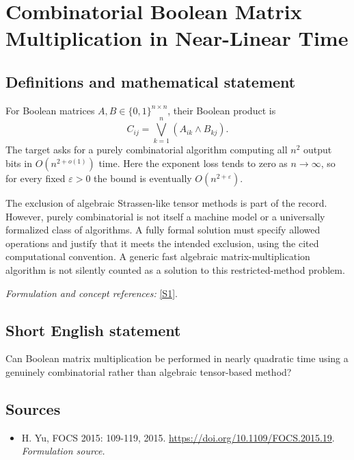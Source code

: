 \documentclass[11pt]{article}
\begin{document}
\section*{\texorpdfstring{Combinatorial Boolean Matrix Multiplication in Near-Linear Time}{Combinatorial Boolean Matrix Multiplication in Near-Linear Time}}\label{30006960}
\subsection{Definitions and mathematical statement}
For Boolean matrices $A,B\in\{0,1\}^{n\times n}$, their Boolean product is
\[
 C_{ij}=\bigvee_{k=1}^n(A_{ik}\wedge B_{kj}).
\]
The target asks for a purely combinatorial algorithm computing all $n^2$ output bits in $O(n^{2+o(1)})$ time. Here the exponent loss tends to zero as $n\to\infty$, so for every fixed ${\varepsilon}>0$ the bound is eventually $O(n^{2+{\varepsilon}})$.

The exclusion of algebraic Strassen-like tensor methods is part of the record. However, purely combinatorial is not itself a machine model or a universally formalized class of algorithms. A fully formal solution must specify allowed operations and justify that it meets the intended exclusion, using the cited computational convention. A generic fast algebraic matrix-multiplication algorithm is not silently counted as a solution to this restricted-method problem.
\par\smallskip\textit{Formulation and concept references:} \href{https://doi.org/10.1109/FOCS.2015.19}{[S1]}.

\subsection{Short English statement}
Can Boolean matrix multiplication be performed in nearly quadratic time using a genuinely combinatorial rather than algebraic tensor-based method?
\subsection{Sources}
\begin{itemize}
\item[S1]H. Yu, FOCS 2015: 109-119, 2015.
\url{https://doi.org/10.1109/FOCS.2015.19}.
\textit{Formulation source.}
\end{itemize}
\end{document}
